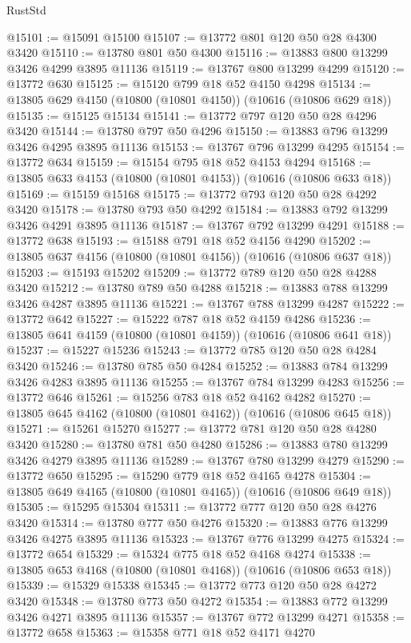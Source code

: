 \begin{lexlean}{RustStd}
\begin{coremodule}
@15101 := @15091 @15100
@15107 := @13772 @801 @120 @50 @28 @4300 @3420
@15110 := @13780 @801 @50 @4300
@15116 := @13883 @800 @13299 @3426 @4299 @3895 @11136
@15119 := @13767 @800 @13299 @4299
@15120 := @13772 @630
@15125 := @15120 @799 @18 @52 @4150 @4298
@15134 := @13805 @629 @4150 (@10800 (@10801 @4150)) (@10616 (@10806 @629 @18))
@15135 := @15125 @15134
@15141 := @13772 @797 @120 @50 @28 @4296 @3420
@15144 := @13780 @797 @50 @4296
@15150 := @13883 @796 @13299 @3426 @4295 @3895 @11136
@15153 := @13767 @796 @13299 @4295
@15154 := @13772 @634
@15159 := @15154 @795 @18 @52 @4153 @4294
@15168 := @13805 @633 @4153 (@10800 (@10801 @4153)) (@10616 (@10806 @633 @18))
@15169 := @15159 @15168
@15175 := @13772 @793 @120 @50 @28 @4292 @3420
@15178 := @13780 @793 @50 @4292
@15184 := @13883 @792 @13299 @3426 @4291 @3895 @11136
@15187 := @13767 @792 @13299 @4291
@15188 := @13772 @638
@15193 := @15188 @791 @18 @52 @4156 @4290
@15202 := @13805 @637 @4156 (@10800 (@10801 @4156)) (@10616 (@10806 @637 @18))
@15203 := @15193 @15202
@15209 := @13772 @789 @120 @50 @28 @4288 @3420
@15212 := @13780 @789 @50 @4288
@15218 := @13883 @788 @13299 @3426 @4287 @3895 @11136
@15221 := @13767 @788 @13299 @4287
@15222 := @13772 @642
@15227 := @15222 @787 @18 @52 @4159 @4286
@15236 := @13805 @641 @4159 (@10800 (@10801 @4159)) (@10616 (@10806 @641 @18))
@15237 := @15227 @15236
@15243 := @13772 @785 @120 @50 @28 @4284 @3420
@15246 := @13780 @785 @50 @4284
@15252 := @13883 @784 @13299 @3426 @4283 @3895 @11136
@15255 := @13767 @784 @13299 @4283
@15256 := @13772 @646
@15261 := @15256 @783 @18 @52 @4162 @4282
@15270 := @13805 @645 @4162 (@10800 (@10801 @4162)) (@10616 (@10806 @645 @18))
@15271 := @15261 @15270
@15277 := @13772 @781 @120 @50 @28 @4280 @3420
@15280 := @13780 @781 @50 @4280
@15286 := @13883 @780 @13299 @3426 @4279 @3895 @11136
@15289 := @13767 @780 @13299 @4279
@15290 := @13772 @650
@15295 := @15290 @779 @18 @52 @4165 @4278
@15304 := @13805 @649 @4165 (@10800 (@10801 @4165)) (@10616 (@10806 @649 @18))
@15305 := @15295 @15304
@15311 := @13772 @777 @120 @50 @28 @4276 @3420
@15314 := @13780 @777 @50 @4276
@15320 := @13883 @776 @13299 @3426 @4275 @3895 @11136
@15323 := @13767 @776 @13299 @4275
@15324 := @13772 @654
@15329 := @15324 @775 @18 @52 @4168 @4274
@15338 := @13805 @653 @4168 (@10800 (@10801 @4168)) (@10616 (@10806 @653 @18))
@15339 := @15329 @15338
@15345 := @13772 @773 @120 @50 @28 @4272 @3420
@15348 := @13780 @773 @50 @4272
@15354 := @13883 @772 @13299 @3426 @4271 @3895 @11136
@15357 := @13767 @772 @13299 @4271
@15358 := @13772 @658
@15363 := @15358 @771 @18 @52 @4171 @4270

\end{coremodule}
\end{lexlean}
